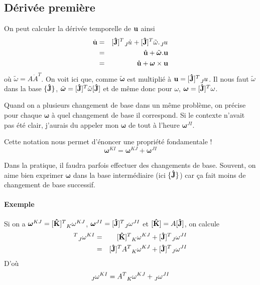 \documentclass[11pt,a4paper]{article} %
\newcommand\fv[1]{{\bf #1}} %
\newcommand\fvd[1]{\dot{\bf #1}} %
\newcommand\fvr[1]{\mathring{\bf #1}} %
\newcommand\uj{{\bf\hat{J}}} %
\newcommand\uk{{\bf\hat{K}}} %
\newcommand\wrt[2]{\tensor*[_{ #1}]{ #2}{}} %
\newcommand\wtr[3]{\tensor*[_{ #1}]{ #2}{^{ #3}}} %
\newcommand\omegaf{{\bm \omega}}
\newcommand\omegaft{\tilde{\bm \omega}}
\newcommand\omegat{\tilde{\omega}}
\begin{document}
\subsection{Dérivée première}
On peut calculer la dérivée temporelle de $\fv{u}$ ainsi
\begin{eqnarray*}
	\fvd{u} &=& [\uj]^T \wrt{J}{\dot{u}} + [\uj]^T \omegat.\wrt{J}{u}\\
	&=& \fvr{u} + \omegaft . \fv{u}\\
	&=& \fvr{u} + \omegaf \times \fv{u}
\end{eqnarray*}
où $\omegat = A\dot{A}^T$.
On voit ici que, comme $\omegaft$ est multiplié à $\fv{u} = [\uj]^T \wrt{J}{u}$. Il nous faut $\omegat$ dans la base $\{\uj\}$, $\omegaft = [\uj]^T \omegat [\uj]$ et de même donc pour $\omega$, $\omegaf = [\uj]^T \omega$.

Quand on a plusieurs changement de base dans un même problème, on précise pour chaque $\omegaf$ à quel changement de base il correspond. Si le contexte n'avait pas été clair, j'aurais du appeler mon $\omegaf$ de tout à l'heure $\omegaf^{JI}$.

Cette notation nous permet d'énoncer une propriété fondamentale !
\[ \omegaf^{KI} = \omegaf^{KJ} + \omegaf^{JI} \]

Dans la pratique, il faudra parfois effectuer des changements de base. Souvent, on aime bien exprimer $\omegaf$ dans la base intermédiaire (ici $\{\uj\}$) car ça fait moins de changement de base successif.

\paragraph{Exemple}
Si on a $\omegaf^{KJ} = [\uk]^T \wtr{K}{\omega}{KJ}$, $\omegaf^{JI} = [\uj]^T \wtr{J}{\omega}{JI}$ et $[\uk] = A[\uj]$, on calcule
\begin{eqnarray*}
	[\uj]^T \wtr{J}{\omega}{KI} &=& [\uk]^T \wtr{K}{\omega}{KJ} + [\uj]^T \wtr{J}{\omega}{JI}\\
	&=& [\uj]^T A^T \wtr{K}{\omega}{KJ} + [\uj]^T \wtr{J}{\omega}{JI}
\end{eqnarray*}
D'où
\[ \wtr{J}{\omega}{KI} = A^T \wtr{K}{\omega}{KJ} + \wtr{J}{\omega}{JI} \]
\end{document}
